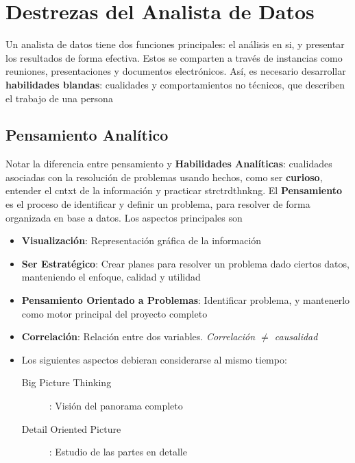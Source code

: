 
\section{Destrezas del Analista de Datos}
Un analista de datos tiene dos funciones principales: el análisis en si, y presentar los resultados de forma efectiva. Estos se comparten a través de instancias como reuniones, presentaciones y documentos electrónicos. Así, es necesario desarrollar \textbf{habilidades blandas}: cualidades y comportamientos no técnicos, que describen el trabajo de una persona

\subsection{Pensamiento Analítico}
Notar la diferencia entre pensamiento y \textbf{Habilidades Analíticas}: cualidades asociadas con la resolución de problemas usando hechos,  como ser \textbf{curioso}, entender el \gls{cntxt} de la información y practicar \gls{strctrdthnkng}. El \textbf{Pensamiento} es el proceso de identificar y definir un problema, para resolver de forma organizada en base a datos. Los aspectos principales son
\begin{itemize}
    \item{\textbf{Visualización}: Representación gráfica de la información}
    \item{\textbf{Ser Estratégico}: Crear planes para resolver un problema dado ciertos datos, manteniendo el enfoque, calidad y utilidad}
    \item{\textbf{Pensamiento Orientado a Problemas}: Identificar problema, y mantenerlo como motor principal del proyecto completo}
    \item{\textbf{Correlación}: Relación entre dos variables. \textit{Correlación ${\neq}$ causalidad}}
    \item{Los siguientes aspectos debieran considerarse al mismo tiempo:
    \begin{description}
        \item[Big Picture Thinking]: Visión del panorama completo
        \item[Detail Oriented Picture]: Estudio de las partes en detalle
    \end{description}}
\end{itemize}

